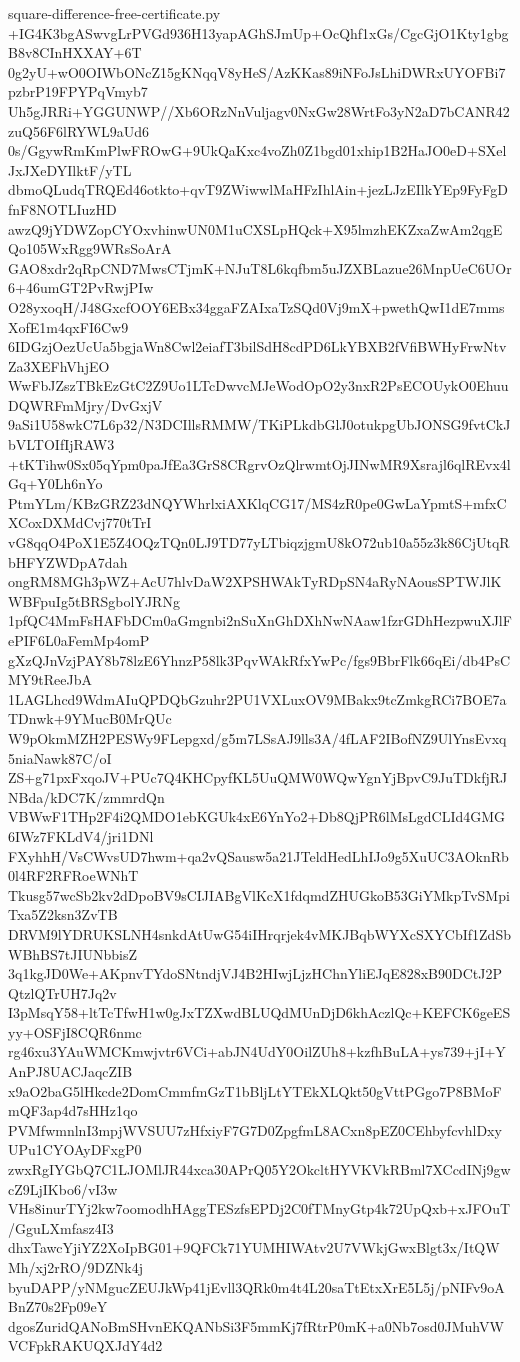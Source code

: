 \documentclass[11pt]{article}
\theoremstyle{definition}
\theoremstyle{remark}
\begin{document}
\begin{filecontents*}[overwrite]{square-difference-free-certificate.py}
+IG4K3bgASwvgLrPVGd936H13yapAGhSJmUp+OcQhf1xGs/CgcGjO1Kty1gbgB8v8CInHXXAY+6T
0g2yU+wO0OIWbONcZ15gKNqqV8yHeS/AzKKas89iNFoJsLhiDWRxUYOFBi7pzbrP19FPYPqVmyb7
Uh5gJRRi+YGGUNWP//Xb6ORzNnVuljagv0NxGw28WrtFo3yN2aD7bCANR42zuQ56F6lRYWL9aUd6
0s/GgywRmKmPlwFROwG+9UkQaKxc4voZh0Z1bgd01xhip1B2HaJO0eD+SXelJxJXeDYIlktF/yTL
dbmoQLudqTRQEd46otkto+qvT9ZWiwwlMaHFzIhlAin+jezLJzEIlkYEp9FyFgDfnF8NOTLIuzHD
awzQ9jYDWZopCYOxvhinwUN0M1uCXSLpHQck+X95lmzhEKZxaZwAm2qgEQo105WxRgg9WRsSoArA
GAO8xdr2qRpCND7MwsCTjmK+NJuT8L6kqfbm5uJZXBLazue26MnpUeC6UOr6+46umGT2PvRwjPIw
O28yxoqH/J48GxcfOOY6EBx34ggaFZAIxaTzSQd0Vj9mX+pwethQwI1dE7mmsXofE1m4qxFI6Cw9
6IDGzjOezUcUa5bgjaWn8Cwl2eiafT3bilSdH8cdPD6LkYBXB2fVfiBWHyFrwNtvZa3XEFhVhjEO
WwFbJZszTBkEzGtC2Z9Uo1LTcDwvcMJeWodOpO2y3nxR2PsECOUykO0EhuuDQWRFmMjry/DvGxjV
9aSi1U58wkC7L6p32/N3DCIllsRMMW/TKiPLkdbGlJ0otukpgUbJONSG9fvtCkJbVLTOIfIjRAW3
+tKTihw0Sx05qYpm0paJfEa3GrS8CRgrvOzQlrwmtOjJINwMR9Xsrajl6qlREvx4lGq+Y0Lh6nYo
PtmYLm/KBzGRZ23dNQYWhrlxiAXKlqCG17/MS4zR0pe0GwLaYpmtS+mfxCXCoxDXMdCvj770tTrI
vG8qqO4PoX1E5Z4OQzTQn0LJ9TD77yLTbiqzjgmU8kO72ub10a55z3k86CjUtqRbHFYZWDpA7dah
ongRM8MGh3pWZ+AcU7hlvDaW2XPSHWAkTyRDpSN4aRyNAousSPTWJlKWBFpuIg5tBRSgbolYJRNg
1pfQC4MmFsHAFbDCm0aGmgnbi2nSuXnGhDXhNwNAaw1fzrGDhHezpwuXJlFePIF6L0aFemMp4omP
gXzQJnVzjPAY8b78lzE6YhnzP58lk3PqvWAkRfxYwPc/fgs9BbrFlk66qEi/db4PsCMY9tReeJbA
1LAGLhcd9WdmAIuQPDQbGzuhr2PU1VXLuxOV9MBakx9tcZmkgRCi7BOE7aTDnwk+9YMucB0MrQUc
W9pOkmMZH2PESWy9FLepgxd/g5m7LSsAJ9lls3A/4fLAF2IBofNZ9UlYnsEvxq5niaNawk87C/oI
ZS+g71pxFxqoJV+PUc7Q4KHCpyfKL5UuQMW0WQwYgnYjBpvC9JuTDkfjRJNBda/kDC7K/zmmrdQn
VBWwF1THp2F4i2QMDO1ebKGUk4xE6YnYo2+Db8QjPR6lMsLgdCLId4GMG6IWz7FKLdV4/jri1DNl
FXyhhH/VsCWvsUD7hwm+qa2vQSausw5a21JTeldHedLhIJo9g5XuUC3AOknRb0l4RF2RFRoeWNhT
Tkusg57wcSb2kv2dDpoBV9sCIJIABgVlKcX1fdqmdZHUGkoB53GiYMkpTvSMpiTxa5Z2ksn3ZvTB
DRVM9lYDRUKSLNH4snkdAtUwG54iIHrqrjek4vMKJBqbWYXcSXYCbIf1ZdSbWBhBS7tJIUNbbisZ
3q1kgJD0We+AKpnvTYdoSNtndjVJ4B2HIwjLjzHChnYliEJqE828xB90DCtJ2PQtzlQTrUH7Jq2v
I3pMsqY58+ltTcTfwH1w0gJxTZXwdBLUQdMUnDjD6khAczlQc+KEFCK6geESyy+OSFjI8CQR6nmc
rg46xu3YAuWMCKmwjvtr6VCi+abJN4UdY0OilZUh8+kzfhBuLA+ys739+jI+YAnPJ8UACJaqcZIB
x9aO2baG5lHkcde2DomCmmfmGzT1bBljLtYTEkXLQkt50gVttPGgo7P8BMoFmQF3ap4d7sHHz1qo
PVMfwmnlnI3mpjWVSUU7zHfxiyF7G7D0ZpgfmL8ACxn8pEZ0CEhbyfcvhlDxyUPu1CYOAyDFxgP0
zwxRgIYGbQ7C1LJOMlJR44xca30APrQ05Y2OkcltHYVKVkRBml7XCcdINj9gwcZ9LjIKbo6/vI3w
VHs8inurTYj2kw7oomodhHAggTESzfsEPDj2C0fTMnyGtp4k72UpQxb+xJFOuT/GguLXmfasz4I3
dhxTawcYjiYZ2XoIpBG01+9QFCk71YUMHIWAtv2U7VWkjGwxBlgt3x/ItQWMh/xj2rRO/9DZNk4j
byuDAPP/yNMgucZEUJkWp41jEvll3QRk0m4t4L20saTtEtxXrE5L5j/pNIFv9oABnZ70s2Fp09eY
dgosZuridQANoBmSHvnEKQANbSi3F5mmKj7fRtrP0mK+a0Nb7osd0JMuhVWVCFpkRAKUQXJdY4d2

\end{filecontents*}
\end{document}
